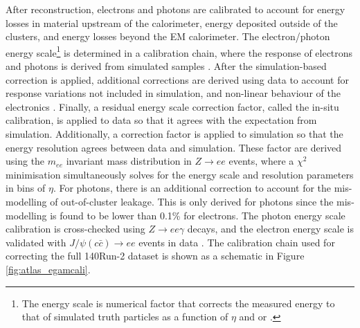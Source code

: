 After reconstruction, electrons and photons are calibrated to account for energy losses in material upstream of the calorimeter, energy deposited outside of the clusters, and energy losses beyond the EM calorimeter. The electron/photon energy scale\footnote{The energy scale is numerical factor that corrects the measured energy to that of simulated truth particles as a function of $\eta$ and \et or \pt.} is determined in a calibration chain, where the response of electrons and photons is derived from simulated samples \cite{Atlas:egamcal_run2,Atlas:egamcal_run1}. After the simulation-based correction is applied, additional corrections are derived using data to account for response variations not included in simulation, and non-linear behaviour of the electronics \cite{Atlas:egamcal_fullrun2}. Finally, a residual energy scale correction factor, called the in-situ calibration, is applied to data so that it agrees with the expectation from simulation. Additionally, a correction factor is applied to simulation so that the energy resolution agrees between data and simulation. These factor are derived using the $m_{ee}$ invariant mass distribution in $Z\rightarrow ee$ events, where a $\chi^2$ minimisation simultaneously solves for the energy scale and resolution parameters in bins of $\eta$. For photons, there is an additional correction to account for the mis-modelling of out-of-cluster leakage. This is only derived for photons since the mis-modelling is found to be lower than 0.1\% for electrons. The photon energy scale calibration is cross-checked using $Z\rightarrow ee\gamma$ decays, and the electron energy scale is validated with $J/\psi(c\bar{c})\rightarrow ee$ events in data \cite{Atlas:egamcal_run1,Atlas:egamcal_fullrun2}. The calibration chain used for correcting the full 140\infb Run-2 dataset is shown as a schematic in Figure \ref{fig:atlas_egamcali}.

